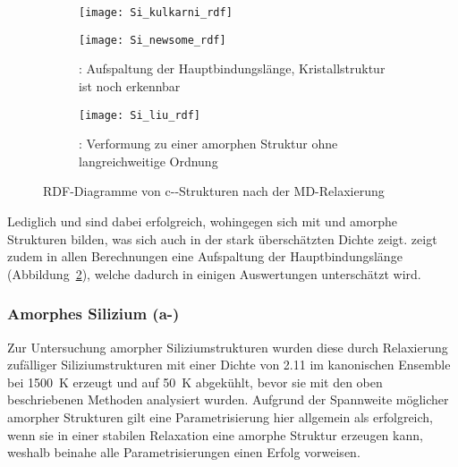 \begin{figure}[p]
  \centering

  \captionsetup[subfigure]{singlelinecheck=false}
  \def\subfigwidth{\textwidth}
  \begin{subfigure}[t]{\subfigwidth}
    \texttt{[image: Si\_kulkarni\_rdf]}
    \label{fig:kulkarnirdf}
  \end{subfigure}

  \vspace{1em}

  \begin{subfigure}[t]{\subfigwidth}
    \texttt{[image: Si\_newsome\_rdf]}
    \caption{: Aufspaltung der Hauptbindungslänge, Kristallstruktur ist noch erkennbar}
    \label{fig:newsomerdf}
  \end{subfigure}

  \vspace{1em}

  \begin{subfigure}[t]{\subfigwidth}
    \texttt{[image: Si\_liu\_rdf]}
    \caption{: Verformung zu einer amorphen Struktur ohne langreichweitige Ordnung}
    \label{fig:liurdf}
  \end{subfigure}

  \caption{RDF-Diagramme von c--Strukturen nach der MD-Relaxierung}
  \label{fig:siliconrdf}
\end{figure}

Lediglich  und  sind dabei erfolgreich, wohingegen sich mit  und  amorphe Strukturen bilden, was sich auch in der stark überschätzten Dichte zeigt.
 zeigt zudem in allen Berechnungen eine Aufspaltung der Hauptbindungslänge (Abbildung~\ref{fig:newsomerdf}), welche dadurch in einigen Auswertungen unterschätzt wird.

\subsubsection{Amorphes Silizium (a-)}

Zur Untersuchung amorpher Siliziumstrukturen wurden diese durch Relaxierung zufälliger Siliziumstrukturen mit einer Dichte von \SI{2.11}{\gpcc} im kanonischen Ensemble bei \SI{1500}{\kelvin} erzeugt und auf \SI{50}{\kelvin} abgekühlt, bevor sie mit den oben beschriebenen Methoden analysiert wurden.
Aufgrund der Spannweite möglicher amorpher Strukturen gilt eine Parametrisierung hier allgemein als erfolgreich, wenn sie in einer stabilen Relaxation eine amorphe Struktur erzeugen kann, weshalb beinahe alle Parametrisierungen einen Erfolg vorweisen.

